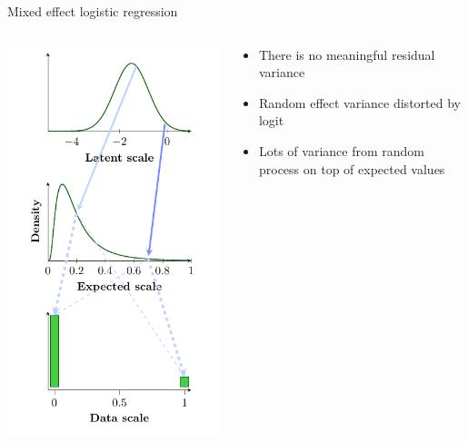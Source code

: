\documentclass{beamer}\usepackage[]{graphicx}\usepackage[]{color}
\begin{document}
\begin{frame}{Mixed effect logistic regression}
\begin{columns}
\begin{column}{0.3\textwidth}
\includegraphics[height=0.8\textheight]{figure/backtransformation.pdf}
\end{column}
\begin{column}{0.7\textwidth}
\begin{itemize}
  \item There is no meaningful residual variance
  \item Random effect variance distorted by logit
  \item Lots of variance from random process on top of expected values
\end{itemize}
\end{column}
\end{columns}

\end{frame}
\end{document}
